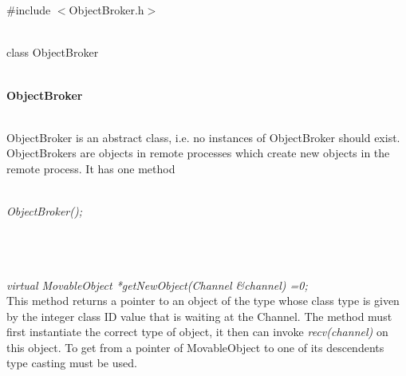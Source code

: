 
 \\

   \\
\#include $<$ObjectBroker.h$>$  


  \\
class ObjectBroker 


 \\
{\bf ObjectBroker} 


  \\
\indent ObjectBroker is an abstract class, i.e. no instances of ObjectBroker
should exist. ObjectBrokers are objects in remote processes which
create new objects in the remote process. It has one method

  \\
{\em ObjectBroker();}  


 \\
\\ 

  \\
{\em virtual MovableObject *getNewObject(Channel \&channel) =0;} \\
This method returns a pointer to an object of the type whose class
type is given by the integer class ID value that is waiting at the Channel.
The method must first instantiate the correct type of object, it then
can invoke {\em recv(channel)} on this object. To get from a pointer
of MovableObject to one of its descendents type casting must be
used. \\ 

  \\
